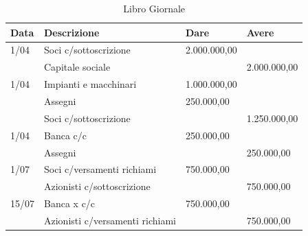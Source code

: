 \documentclass{report}
\begin{document}
\begin{table}[h]
    \centering
    \caption{Libro Giornale}
    \begin{tabular}{|l|l|l|l|}
    \hline
    Data & Descrizione & Dare & Avere \\
    \hline
    1/04 & Soci c/sottoscrizione & 2.000.000,00 & \\
         & Capitale sociale & & 2.000.000,00 \\
    \hline
    1/04 & Impianti e macchinari & 1.000.000,00 & \\
         & Assegni & 250.000,00 & \\
         & Soci c/sottoscrizione & & 1.250.000,00 \\
    \hline
    1/04 & Banca c/c & 250.000,00 & \\
         & Assegni & & 250.000,00 \\
    \hline
    1/07 & Soci c/versamenti richiami & 750.000,00 & \\
         & Azionisti c/sottoscrizione & & 750.000,00 \\
    \hline
    15/07 & Banca x c/c & 750.000,00 & \\
          & Azionisti c/versamenti richiami & & 750.000,00 \\
    \hline
    \end{tabular}
\end{table}

\end{document}
